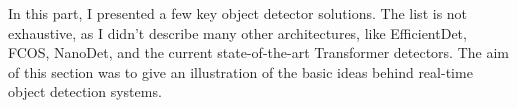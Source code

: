 In this part, I presented a few key object detector solutions. The list is not exhaustive, as I didn't describe many other architectures, like EfficientDet, FCOS, NanoDet, and the current state-of-the-art Transformer detectors. The aim of this section was to give an illustration of the basic ideas behind real-time object detection systems.